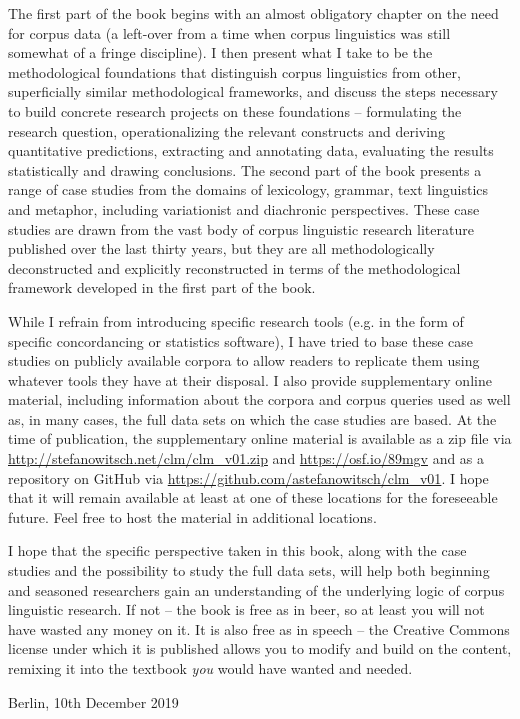 The first part of the book begins with an almost obligatory chapter on the need for corpus data (a left\hyp{}over from a time when corpus linguistics was still somewhat of a fringe discipline). I then present what I take to be the methodological foundations that distinguish corpus linguistics from other, superficially similar methodological frameworks, and discuss the steps necessary to build concrete research projects on these foundations – formulating the research question, operationalizing the relevant constructs and deriving quantitative predictions, extracting and annotating data, evaluating the results statistically and drawing conclusions. The second part of the book presents a range of case studies from the domains of lexicology, grammar, text linguistics and metaphor, including variationist and diachronic perspectives. These case studies are drawn from the vast body of corpus linguistic research literature published over the last thirty years, but they are all methodologically deconstructed and explicitly reconstructed in terms of the methodological framework developed in the first part of the book.

While I refrain from introducing specific research tools (e.g. in the form of specific concordancing or statistics software), I have tried to base these case studies on publicly available corpora to allow readers to replicate them using whatever tools they have at their disposal. I also provide supplementary online material, including information about the corpora and corpus queries used as well as, in many cases, the full data sets on which the case studies are based. At the time of publication, the supplementary online material is available as a zip file via \url{http://stefanowitsch.net/clm/clm_v01.zip} and \url{https://osf.io/89mgv} and as a repository on GitHub via \url{https://github.com/astefanowitsch/clm_v01}. I hope that it will remain available at least at one of these locations for the foreseeable future. Feel free to host the material in additional locations.

I hope that the specific perspective taken in this book, along with the case studies and the possibility to study the full data sets, will help both beginning and seasoned researchers gain an understanding of the underlying logic of corpus linguistic research. If not -- the book is free as in beer, so at least you will not have wasted any money on it. It is also free as in speech -- the Creative Commons license under which it is published allows you to modify and build on the content, remixing it into the textbook \emph{you} would have wanted and needed.

\begin{flushright}
Berlin, 10th December 2019
\end{flushright}
